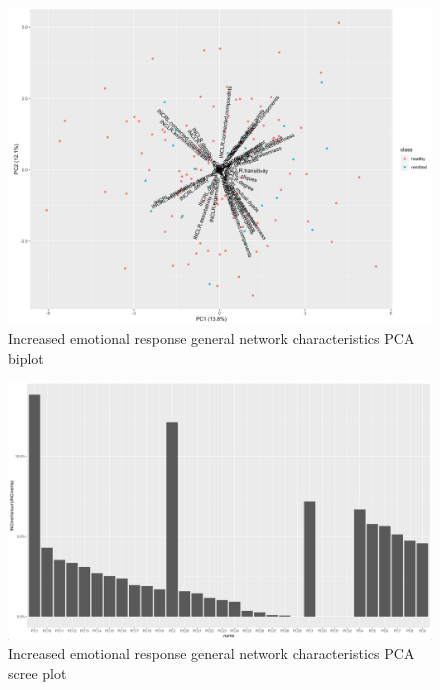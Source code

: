 \documentclass[12pt]{report}
\begin{document}
		\begin{figure}[H]
			\centering
			\includegraphics[scale=0.25]{Images/INCgraphstats_biplot.png}
			\caption{Increased emotional response general network characteristics PCA biplot}
			\label{incgraphstatspcabiplot}
		\end{figure}
	
		\begin{figure}[H]
			\centering
			\includegraphics[scale=0.2]{Images/INCgraphstats_screeplot.png}
			\caption{Increased emotional response general network characteristics PCA scree plot}
			\label{incgraphstatspcascreeplot}
		\end{figure}
	
\end{document}
